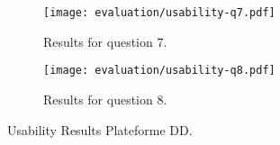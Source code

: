 \begin{figure}[H]\ContinuedFloat
	\centering
	\begin{subfigure}{.8\textwidth}
  		\centering
  		\texttt{[image: evaluation/usability-q7.pdf]}
  		\caption{Results for question 7.}
	\end{subfigure}\par\bigskip
	
	\begin{subfigure}{.8\textwidth}
  		\centering
  		\texttt{[image: evaluation/usability-q8.pdf]}
  		\caption{Results for question 8.}
	\end{subfigure}
	\caption{Usability Results Plateforme DD.}
	\label{fig:evaluation-pdd-usability}
\end{figure}
\clearpage



